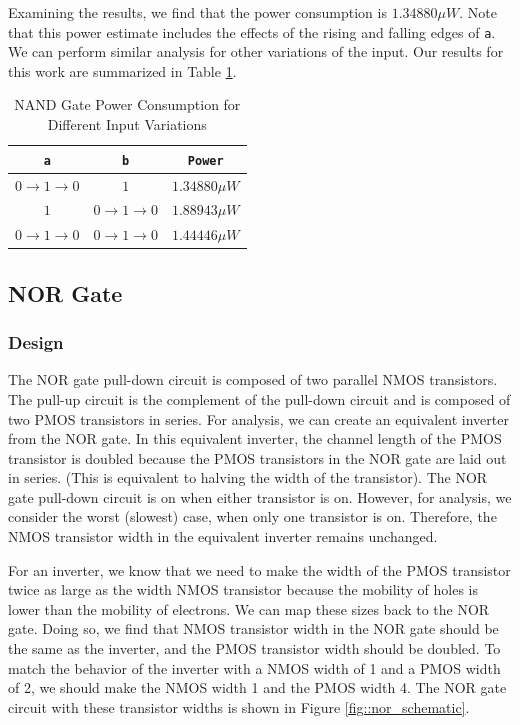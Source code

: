 \documentclass[fleqn]{article}
\begin{document}
	\noindent Examining the results, we find that the power consumption is $1.34880{\mu}W$. Note that this power estimate includes the effects of the rising and falling edges of \texttt{a}. We can perform similar analysis for other variations of the input. Our results for this work are summarized in Table \ref{table::nand_gate_power_analysis}.
	
	\begin{table}[H]
	\begin{center}
	\caption{NAND Gate Power Consumption for Different Input Variations}
	\label{table::nand_gate_power_analysis}
	\begin{tabular}{| c | c | c |}
		\hline
		\texttt{a} & \texttt{b} & \texttt{Power}\\
		\hline	
		$0 \rightarrow 1 \rightarrow 0$ & $1$ & $1.34880{\mu}W$ \\
		\hline	
		$1$ & $0 \rightarrow 1 \rightarrow 0$ & $1.88943{\mu}W$ \\
		\hline	
		$0 \rightarrow 1 \rightarrow 0$ & $0 \rightarrow 1 \rightarrow 0$ & $1.44446{\mu}W$\\
		\hline
	\end{tabular}
	\end{center}
	\end{table}
	
	\subsection{NOR Gate}
	
	\subsubsection{Design}
	
	The NOR gate pull-down circuit is composed of two parallel NMOS transistors. The pull-up circuit is the complement of the pull-down circuit and is composed of two PMOS transistors in series. For analysis, we can create an equivalent inverter from the NOR gate. In this equivalent inverter, the channel length of the PMOS transistor is doubled because the PMOS transistors in the NOR gate are laid out in series. (This is equivalent to halving the width of the transistor). The NOR gate pull-down circuit is on when either transistor is on. However, for analysis, we consider the worst (slowest) case, when only one transistor is on. Therefore, the NMOS transistor width in the equivalent inverter remains unchanged.
	
	For an inverter, we know that we need to make the width of the PMOS transistor twice as large as the width NMOS transistor because the mobility of holes is lower than the mobility of electrons. We can map these sizes back to the NOR gate. Doing so, we find that NMOS transistor width in the NOR gate should be the same as the inverter, and the PMOS transistor width should be doubled. To match the behavior of the inverter with a NMOS width of 1 and a PMOS width of 2, we should make the NMOS width 1 and the PMOS width 4. The NOR gate circuit with these transistor widths is shown in Figure \ref{fig::nor_schematic}.
	
\end{document}
